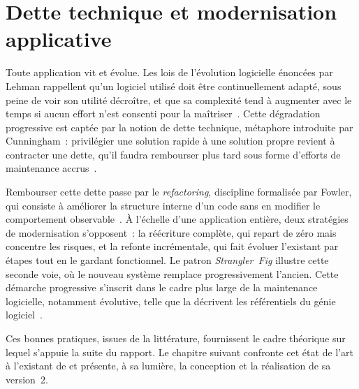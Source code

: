 \section{Dette technique et modernisation applicative}
\label{sec:dette-technique}

Toute application vit et évolue. Les lois de l'évolution logicielle énoncées par
Lehman rappellent qu'un logiciel utilisé doit être continuellement adapté, sous
peine de voir son utilité décroître, et que sa complexité tend à augmenter avec
le temps si aucun effort n'est consenti pour la maîtriser~\cite{lehman1980evolution}.
Cette dégradation progressive est captée par la notion de dette technique,
métaphore introduite par Cunningham~: privilégier une solution rapide à une
solution propre revient à contracter une dette, qu'il faudra rembourser plus tard
sous forme d'efforts de maintenance accrus~\cite{cunningham1992wycash}.

Rembourser cette dette passe par le \textit{refactoring}, discipline formalisée
par Fowler, qui consiste à améliorer la structure interne d'un code sans en
modifier le comportement observable~\cite{fowler2018refactoring}. À l'échelle
d'une application entière, deux stratégies de modernisation s'opposent~: la
réécriture complète, qui repart de zéro mais concentre les risques, et la refonte
incrémentale, qui fait évoluer l'existant par étapes tout en le gardant
fonctionnel. Le patron \textit{Strangler~Fig} illustre cette seconde voie, où le
nouveau système remplace progressivement l'ancien.
Cette démarche progressive s'inscrit dans le cadre plus large de la maintenance
logicielle, notamment évolutive, telle que la décrivent les référentiels du génie
logiciel~\cite{iso14764}.

Ces bonnes pratiques, issues de la littérature, fournissent le cadre théorique
sur lequel s'appuie la suite du rapport. Le chapitre suivant confronte cet état
de l'art à l'existant de \csbag et présente, à sa lumière, la conception et la
réalisation de sa version~2.
